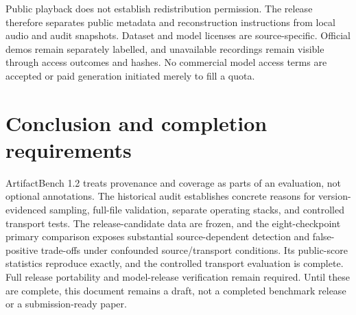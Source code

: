 \documentclass[10pt,a4paper]{article}
\begin{document}
Public playback does not establish redistribution permission. The release
therefore separates public metadata and reconstruction instructions from local
audio and audit snapshots. Dataset and model licenses are source-specific.
Official demos remain separately labelled, and unavailable recordings remain
visible through access outcomes and hashes. No commercial model access terms
are accepted or paid generation initiated merely to fill a quota.

\section{Conclusion and completion requirements}

ArtifactBench 1.2 treats provenance and coverage as parts of an evaluation,
not optional annotations. The historical audit establishes concrete reasons
for version-evidenced sampling, full-file validation, separate operating stacks,
and controlled transport tests. The release-candidate data are frozen, and the
eight-checkpoint primary comparison exposes substantial source-dependent detection
and false-positive trade-offs under confounded source/transport conditions.
Its public-score statistics reproduce exactly, and the controlled transport
evaluation is complete. Full release portability and model-release verification
remain required.
Until these are complete, this document remains a draft, not a
completed benchmark release or a submission-ready paper.



\end{document}
